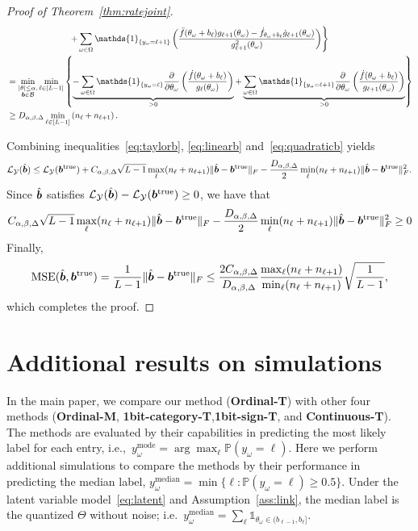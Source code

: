\documentclass[11pt]{article}
\theoremstyle{plain}
\theoremstyle{definition}
\newcommand*{\KeepStyleUnderBrace}[1]{%
  \mathop{%
    \mathchoice
    {\underbrace{\displaystyle#1}}%
    {\underbrace{\textstyle#1}}%
    {\underbrace{\scriptstyle#1}}%
    {\underbrace{\scriptscriptstyle#1}}%
  }\limits
}
\begin{document}
\begin{proof}[Proof of Theorem~\ref{thm:ratejoint}]
\begin{align}
&\left. \hspace{1in}+\sum_{\omega\in\Omega}\mathds{1}_{\{y_\omega=\ell+1\}} \left( {\ddot{f}(\theta_\omega+b_\ell) g_{\ell+1}(\theta_\omega) - \dot{f}_{\theta_\omega+b_\ell}\dot{g}_{\ell+1} (\theta_\omega)\over g^2_{\ell+1}(\theta_\omega)} \right)\right\}\\
&=\min_{\substack{|\theta|\leq \alpha,\\ \mb\in\tB}} \min_{\ell\in[L-1]}\left\{\KeepStyleUnderBrace{-\sum_{\omega\in\Omega} \mathds{1}_{\{y_\omega=\ell\}}{\partial \over \partial \theta_\omega}\left( \dot{f}(\theta_\omega+b_\ell) \over g_\ell(\theta_\omega) \right)}_{>0}+\KeepStyleUnderBrace{\sum_{\omega\in\Omega}\mathds{1}_{\{y_\omega=\ell+1\}} {\partial \over \partial \theta_\omega}\left( \dot{f}(\theta_\omega+b_\ell) \over g_{\ell+1}(\theta_\omega) \right) }_{>0}\right\}\\
&\geq D_{\alpha,\beta,\Delta}  \min_{\ell\in[L-1]}\left(n_{\ell}+n_{\ell+1}\right) .
\end{align}

Combining inequalities~\eqref{eq:taylorb}, \eqref{eq:linearb} and~\eqref{eq:quadraticb} yields
\[
\mathcal{L}_{\mathcal{Y}}(\hat {\bm{b}})\leq \mathcal{L}_{\mathcal{Y}}(\bm{b}^{\text{true}})+C_{\alpha,\beta,\Delta}\sqrt{L-1}\max_{\ell}(n_\ell+n_{\ell+1}) \lVert\hat{\bm{b}}-\bm{b}^{\text{true}}\rVert_F -\frac{D_{\alpha,\beta,\Delta}}{2}\min_{\ell}(n_\ell+n_{\ell+1}) \lVert\hat{\bm{b}}-\bm{b}^{\text{true}}\rVert_F^2 .
\]
Since $\hat {\bm{b}}$ satisfies $\mathcal{L}_{\mathcal{Y}}(\hat {\bm{b}})-\mathcal{L}_{\mathcal{Y}}(\bm{b}^{\text{true}})\geq 0$, we have that
\[
C_{\alpha,\beta,\Delta}\sqrt{L-1}\max_{\ell}(n_\ell+n_{\ell+1}) \lVert\hat{\bm{b}}-\bm{b}^{\text{true}}\rVert_F -\frac{D_{\alpha,\beta,\Delta}}{2}\min_{\ell}(n_\ell+n_{\ell+1}) \lVert\hat{\bm{b}}-\bm{b}^{\text{true}}\rVert_F^2\geq 0
\]
Finally,
\[
\text{MSE}(\hat {\bm{b}},\bm{b}^{\text{true}})={1\over L-1}\lVert\hat{\bm{b}}-\bm{b}^{\text{true}}\rVert_F\leq {2C_{\alpha,\beta,\Delta} \over D_{\alpha,\beta,\Delta}}{\max_{\ell}(n_\ell+n_{\ell+1})\over \min_{\ell}(n_{\ell}+n_{\ell+1})}  \sqrt{1\over L-1},
\]
which completes the proof.
\end{proof}

\section{Additional results on simulations}
In the main paper, we compare our method ({\bf Ordinal-T}) with other four methods ({\bf Ordinal-M}, {\bf 1bit-category-T},{\bf 1bit-sign-T}, and {\bf Continuous-T}). The methods are evaluated by their capabilities in predicting the most likely label for each entry, i.e.,\ $y_\omega^{\text{mode}}=\arg\max_\ell\mathbb{P}(y_\omega=\ell)$. Here we perform additional simulations to compare the methods by their performance in predicting the median label, $y_\omega^{\text{median}}=\min\{\ell\colon\mathbb{P}(y_\omega=\ell)\geq 0.5\}$. Under the latent variable model~\eqref{eq:latent} and Assumption~\ref{ass:link}, the median label is the quantized $\Theta$ without noise; i.e.\ $y_\omega^{\text{median}}=\sum_\ell \mathds{1}_{\theta_\omega\in(b_{\ell-1},b_\ell]}$. 
\end{document}
